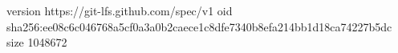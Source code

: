 version https://git-lfs.github.com/spec/v1
oid sha256:ee08c6c046768a5cf0a3a0b2caece1c8dfe7340b8efa214bb1d18ca74227b5dc
size 1048672
